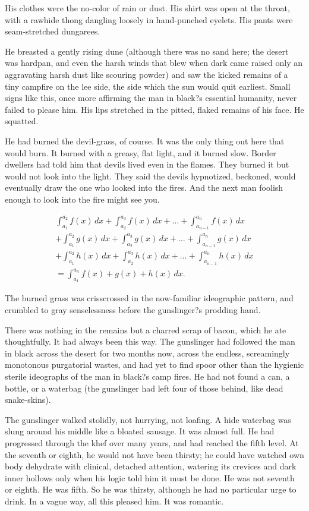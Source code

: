 \documentclass[
11pt,%
tightenlines,%
twoside,%
onecolumn,%
nofloats,%
nobibnotes,%
nofootinbib,%
superscriptaddress,%
noshowpacs,%
centertags]%
{revtex4}
\begin{document}
His clothes were the no-color of rain or dust. His shirt was open at the throat, with a rawhide thong dangling loosely in hand-punched eyelets. His pants were seam-stretched dungarees.

He breasted a gently rising dune (although there was no sand here; the desert was hardpan, and even the harsh winds that blew when dark came raised only an aggravating harsh dust like scouring powder) and saw the kicked remains of a tiny campfire on the lee side, the side which the sun would quit earliest. Small signs like this, once more affirming the man in black?s essential humanity, never failed to please him. His lips stretched in the pitted, flaked remains of his face. He squatted.

He had burned the devil-grass, of course. It was the only thing out here that would burn. It burned with a greasy, flat light, and it burned slow. Border dwellers had told him that devils lived even in the flames. They burned it but would not look into the light. They said the devils hypnotized, beckoned, would eventually draw the one who looked into the fires. And the next man foolish enough to look into the fire might see you.

\begin{multline}
\int_{a_1}^{a_2} f(x)\,dx+\int_{a_2}^{a_3} f(x)\,dx
+\dots+\int_{a_{n-1}}^{a_n} f(x)\,dx\\
+\int_{a_1}^{a_2} g(x)\,dx+\int_{a_2}^{a_3} g(x)\,dx
+\dots+\int_{a_{n-1}}^{a_n} g(x)\,dx\\
+\int_{a_1}^{a_2} h(x)\,dx+\int_{a_2}^{a_3} h(x)\,dx
+\dots+\int_{a_{n-1}}^{a_n} h(x)\,dx\\
=\int_{a_1}^{a_n} f(x)+g(x)+h(x)\,dx.
\end{multline}

The burned grass was crisscrossed in the now-familiar ideographic pattern, and crumbled to gray senselessness before the gunslinger?s prodding hand. 

There was nothing in the remains but a charred scrap of bacon, which he ate thoughtfully. It had always been this way. The gunslinger had followed the man in black across the desert for two months now, across the endless, screamingly monotonous purgatorial wastes, and had yet to find spoor other than the hygienic sterile ideographs of the man in black?s camp fires. He had not found a can, a bottle, or a waterbag (the gunslinger had left four of those behind, like dead snake-skins).

The gunslinger walked stolidly, not hurrying, not loafing. A hide waterbag was slung around his middle like a bloated sausage. It was almost full. He had progressed through the khef over many years, and had reached the fifth level. At the seventh or eighth, he would not have been thirsty; he could have watched own body dehydrate with clinical, detached attention, watering its crevices and dark inner hollows only when his logic told him it must be done. He was not seventh or eighth. He was fifth. So he was thirsty, although he had no particular urge to drink. In a vague way, all this pleased him. It was romantic.
\end{document}
